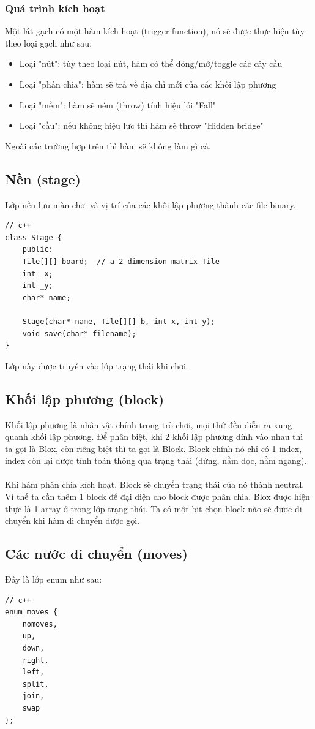 \documentclass[a4paper, 11pt]{article}
\begin{document}
\subsubsection{Quá trình kích hoạt}
Một lát gạch có một hàm kích hoạt (trigger function), nó sẽ được thực hiện tùy theo loại gạch như sau:
\begin{itemize}
	\item Loại "nút": tùy theo loại nút, hàm có thể đóng/mở/toggle các cây cầu
	\item Loại "phân chia": hàm sẽ trả về địa chỉ mới của các khối lập phương
	\item Loại "mềm": hàm sẽ ném (throw) tính hiệu lỗi "Fall"
	\item Loại "cầu": nếu không hiệu lực thì hàm sẽ throw "Hidden bridge"
\end{itemize}
Ngoài các trường hợp trên thì hàm sẽ không làm gì cả.
\subsection{Nền (stage)}
Lớp nền lưu màn chơi và vị trí của các khối lập phương thành các file binary.
\begin{lstlisting}
// c++
class Stage {
    public:
    Tile[][] board;  // a 2 dimension matrix Tile
    int _x;
    int _y;
    char* name;
    
    Stage(char* name, Tile[][] b, int x, int y);
    void save(char* filename);
}
\end{lstlisting}
Lớp này được truyền vào lớp trạng thái khi chơi.
\subsection{Khối lập phương (block)}
Khối lập phương là nhân vật chính trong trò chơi, mọi thứ đều diễn ra xung quanh khối lập phương.
Để phân biệt, khi 2 khối lập phương dính vào nhau thì ta gọi là Blox, còn riêng biệt thì ta gọi là Block.
Block chính nó chỉ có 1 index, index còn lại được tính toán thông qua trạng thái (đứng, nằm dọc, nằm ngang). \\~\\
Khi hàm phân chia kích hoạt, Block sẽ chuyển trạng thái của nó thành neutral. Vì thế ta cần thêm 1 block để
đại diện cho block được phân chia. Blox được hiện thực là 1 array ở trong lớp trạng thái. Ta có một bit chọn
block nào sẽ được di chuyển khi hàm di chuyển được gọi.
\subsection{Các nước di chuyển (moves)}
Đây là lớp enum như sau:
\begin{lstlisting}
// c++
enum moves {
    nomoves,
    up,
    down,
    right,
    left,
    split,
    join,
    swap
};
\end{lstlisting}
\end{document}
